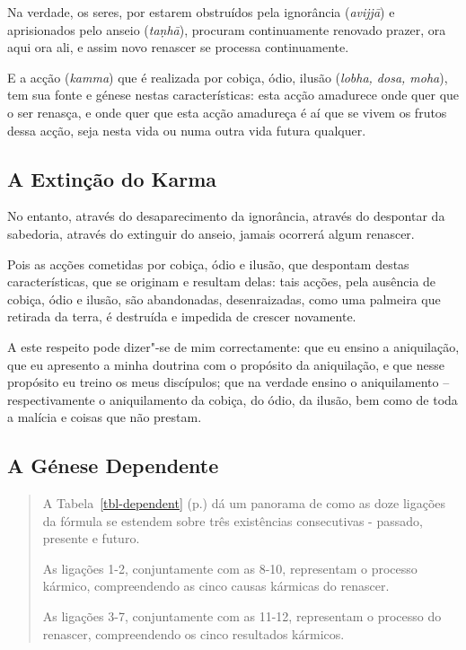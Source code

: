Na verdade, os seres, por estarem obstruídos pela ignorância (\emph{avijjā}) e
aprisionados pelo anseio (\emph{taṇhā}), procuram continuamente renovado prazer,
ora aqui ora ali, e assim novo renascer se processa continuamente.


E a acção (\emph{kamma}) que é realizada por cobiça, ódio, ilusão (\emph{lobha, dosa, moha}), tem sua fonte e génese nestas características: esta acção amadurece onde quer que o ser renasça, e onde quer que esta acção amadureça é aí que se vivem os frutos dessa acção, seja nesta vida ou numa outra vida futura qualquer.


\subsection{A Extinção do Karma}

No entanto, através do desaparecimento da ignorância, através do despontar da
sabedoria, através do extinguir do anseio, jamais ocorrerá algum renascer.


Pois as acções cometidas por cobiça, ódio e ilusão, que despontam destas
características, que se originam e resultam delas: tais acções, pela ausência de
cobiça, ódio e ilusão, são abandonadas, desenraizadas, como uma palmeira que
retirada da terra, é destruída e impedida de crescer novamente.


A este respeito pode dizer"-se de mim correctamente: que eu ensino a aniquilação,
que eu apresento a minha doutrina com o propósito da aniquilação, e que nesse
propósito eu treino os meus discípulos; que na verdade ensino o aniquilamento --
respectivamente o aniquilamento da cobiça, do ódio, da ilusão, bem como de toda
a malícia e coisas que não prestam.


\subsection{A Génese Dependente}

\begin{quote}
  A Tabela~\ref{tbl-dependent} (p.\pageref{tbl-dependent}) dá um panorama de
  como as doze ligações da fórmula se estendem sobre três existências
  consecutivas - passado, presente e futuro.

  As ligações 1-2, conjuntamente com as 8-10, representam o processo kármico,
  compreendendo as cinco causas kármicas do renascer.

  As ligações 3-7, conjuntamente com as 11-12, representam o processo do
  renascer, compreendendo os cinco resultados kármicos.
\end{quote}

